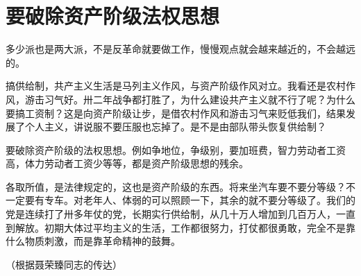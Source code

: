 \section[要破除资产阶级法权思想（一九六七年五月）]{要破除资产阶级法权思想}


多少派也是两大派，不是反革命就要做工作，慢慢观点就会越来越近的，不会越远的。

搞供给制，共产主义生活是马列主义作风，与资产阶级作风对立。我看还是农村作风，游击习气好。卅二年战争都打胜了，为什么建设共产主义就不行了呢？为什么要搞工资制？这是向资产阶级让步，是借农村作风和游击习气来贬低我们，结果发展了个人主义，讲说服不要压服也忘掉了。是不是由部队带头恢复供给制？

要破除资产阶级的法权思想。例如争地位，争级别，要加班费，智力劳动者工资高，体力劳动者工资少等等，都是资产阶级思想的残余。

各取所值，是法律规定的，这也是资产阶级的东西。将来坐汽车要不要分等级？不一定要有专车。对老年人、体弱的可以照顾一下，其余的就不要分等级了。我们的党是连续打了卅多年仗的党，长期实行供给制，从几十万人增加到几百万人，一直到解放。初期大体过平均主义的生活，工作都很努力，打仗都很勇敢，完全不是靠什么物质刺激，而是靠革命精神的鼓舞。

{\raggedleft （根据聂荣臻同志的传达）\par}


